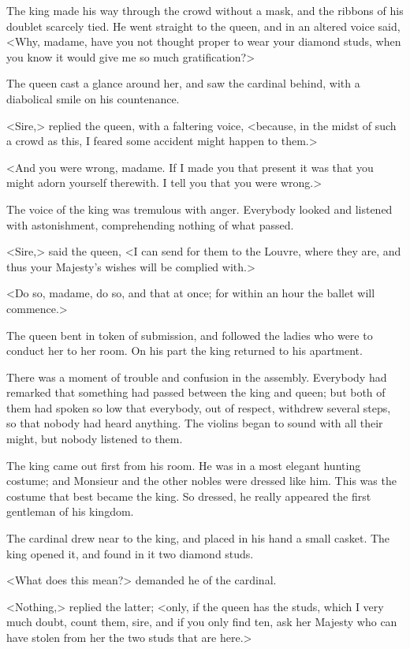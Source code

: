 The king made his way through the crowd without a mask, and the ribbons of his doublet scarcely tied. He went straight to the queen, and in an altered voice said, <Why, madame, have you not thought proper to wear your diamond studs, when you know it would give me so much gratification?> 

The queen cast a glance around her, and saw the cardinal behind, with a diabolical smile on his countenance. 

<Sire,> replied the queen, with a faltering voice, <because, in the midst of such a crowd as this, I feared some accident might happen to them.> 

<And you were wrong, madame. If I made you that present it was that you might adorn yourself therewith. I tell you that you were wrong.> 

The voice of the king was tremulous with anger. Everybody looked and listened with astonishment, comprehending nothing of what passed. 

<Sire,> said the queen, <I can send for them to the Louvre, where they are, and thus your Majesty's wishes will be complied with.> 

<Do so, madame, do so, and that at once; for within an hour the ballet will commence.> 

The queen bent in token of submission, and followed the ladies who were to conduct her to her room. On his part the king returned to his apartment. 

There was a moment of trouble and confusion in the assembly. Everybody had remarked that something had passed between the king and queen; but both of them had spoken so low that everybody, out of respect, withdrew several steps, so that nobody had heard anything. The violins began to sound with all their might, but nobody listened to them. 

The king came out first from his room. He was in a most elegant hunting costume; and Monsieur and the other nobles were dressed like him. This was the costume that best became the king. So dressed, he really appeared the first gentleman of his kingdom. 

The cardinal drew near to the king, and placed in his hand a small casket. The king opened it, and found in it two diamond studs. 

<What does this mean?> demanded he of the cardinal. 

<Nothing,> replied the latter; <only, if the queen has the studs, which I very much doubt, count them, sire, and if you only find ten, ask her Majesty who can have stolen from her the two studs that are here.> 

